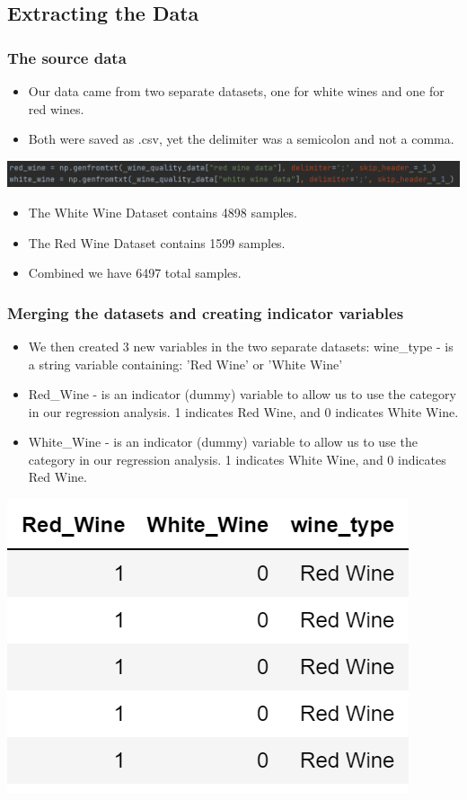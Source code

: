 \documentclass{beamer}
\begin{document}
	
	\subsection{Extracting the Data}
	\begin{frame}
		\frametitle{The source data}
		\begin{itemize}
		\item Our data came from two separate datasets, one for white wines and one for red wines.
		\item Both were saved as .csv, yet the delimiter was a semicolon and not a comma.
		\end{itemize}  
		\includegraphics[width=\textwidth]{images/loading datasets.png}
		\begin{itemize}
		\item The White Wine Dataset contains 4898 samples. 
		\item The Red Wine Dataset contains 1599 samples. 
		\item Combined we have 6497 total samples.
		\end{itemize}
	
	\end{frame}

	
	\begin{frame}
		\frametitle{Merging the datasets and creating indicator variables}
		\begin{itemize}
			\item We then created 3 new variables in the two separate datasets:  
			wine\_type - is a string variable containing: 'Red Wine' or 'White Wine' 
			\item Red\_Wine - is an indicator (dummy) variable to allow us to use the category in our regression analysis.  1 indicates Red Wine, and 0 indicates White Wine.  
			\item White\_Wine - is an indicator (dummy) variable to allow us to use the category in our regression analysis.  1 indicates White Wine, and 0 indicates Red Wine.  
		\end{itemize}
			\begin{center}
				\includegraphics[width=.3\textwidth]{images/wine_type.png}
			\end{center}
	\end{frame}
\end{document}
